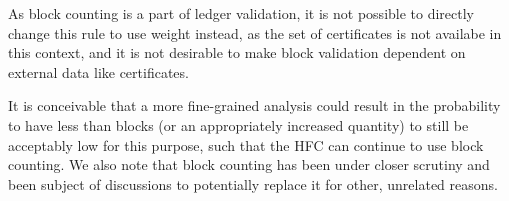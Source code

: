 \begin{description}
  As block counting is a part of ledger validation, it is not possible to directly change this rule to use weight instead, as the set of certificates is not availabe in this context, and it is not desirable to make block validation dependent on external data like certificates.

  It is conceivable that a more fine-grained analysis could result in the probability to have less than \kcp{} blocks (or an appropriately increased quantity) to still be acceptably low for this purpose, such that the HFC can continue to use block counting.
  We also note that block counting has been under closer scrutiny and been subject of discussions to potentially replace it for other, unrelated reasons.
\end{description}


